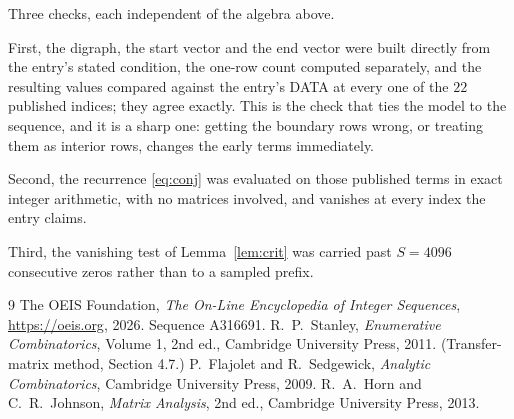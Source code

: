 \documentclass[11pt,a4paper]{article}
\theoremstyle{plain}
\theoremstyle{definition}
\begin{document}
Three checks, each independent of the algebra above.

First, the digraph, the start vector and the end vector were built directly from the
entry's stated condition, the one-row count computed separately, and the resulting values
compared against the entry's DATA at every one of the $22$ published indices; they
agree exactly. This is the check that ties the model to the sequence, and it is a sharp one:
getting the boundary rows wrong, or treating them as interior rows, changes the early terms
immediately.

Second, the recurrence \eqref{eq:conj} was evaluated on those published terms in exact
integer arithmetic, with no matrices involved, and vanishes at every index the entry claims.

Third, the vanishing test of Lemma~\ref{lem:crit} was carried past $S=4096$ consecutive
zeros rather than to a sampled prefix.

\begin{thebibliography}{9}
 The OEIS Foundation, \emph{The On-Line Encyclopedia of Integer
Sequences}, \url{https://oeis.org}, 2026. Sequence A316691.
 R.~P.~Stanley, \emph{Enumerative Combinatorics}, Volume 1, 2nd ed.,
Cambridge University Press, 2011. (Transfer-matrix method, Section 4.7.)
 P.~Flajolet and R.~Sedgewick, \emph{Analytic Combinatorics}, Cambridge
University Press, 2009.
 R.~A.~Horn and C.~R.~Johnson, \emph{Matrix Analysis}, 2nd ed., Cambridge
University Press, 2013.
\end{thebibliography}
\end{document}
